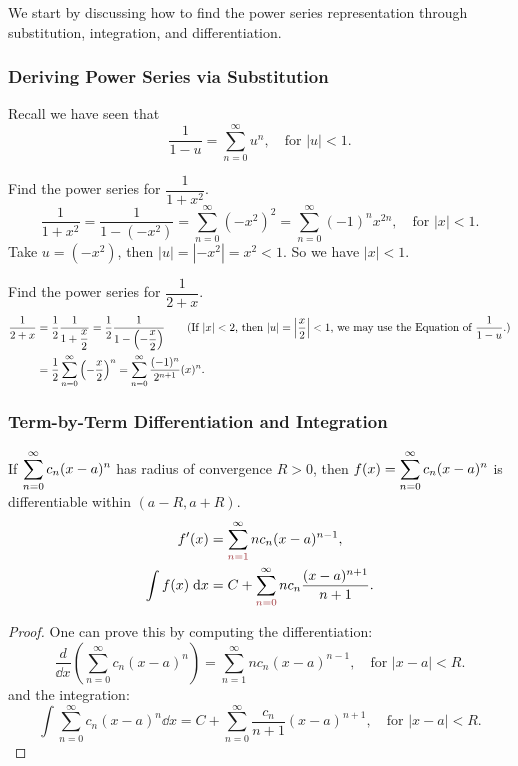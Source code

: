 We start by discussing how to find the power series representation through substitution, integration, and differentiation.

\subsubsection{Deriving Power Series via Substitution}
Recall we have seen that
\[\dfrac{1}{1-u} = \sum_{n=0}^\infty u^n, \quad \text{for } |u| < 1.\]

\begin{ex}
    Find the power series for $\dfrac{1}{1+x^2}$.
    \[
    \dfrac{1}{1+x^2} = \dfrac{1}{1-(-x^2)} = \sum_{n=0}^\infty (-x^2)^2 = \sum_{n=0}^\infty (-1)^n x^{2n}, \quad \text{for } |x| < 1.
    \]
    Take $u = (-x^2)$, then $|u| = |-x^2| = x^2 < 1$. So we have $|x| < 1$.
\end{ex}

\begin{ex}
    Find the power series for $\dfrac{1}{2+x}$.
    \begin{align*}
        \dfrac{1}{2+x} &= \dfrac{1}{2} \dfrac{1}{1+\dfrac{x}{2}} = \dfrac{1}{2} \dfrac{1}{1 - \left(-\dfrac{x}{2}\right)}\tag{If $|x|<2$, then $|u| = \left|\dfrac{x}{2}\right|<1$, we may use the Equation of $\dfrac{1}{1-u}$.}\\
        & = \dfrac{1}{2} \sum_{n=0}^\infty \left(-\dfrac{x}{2}\right)^n = \sum_{n=0}^\infty \dfrac{(-1)^n}{2^{n+1}} (x)^n.
    \end{align*}
\end{ex}

\subsubsection{Term-by-Term Differentiation and Integration}

\begin{thm}
    If $\displaystyle\sum_{n=0}^\infty c_n (x-a)^n$ has radius of convergence $R>0$, then $f(x) = \displaystyle\sum_{n=0}^\infty c_n (x-a)^n$ is differentiable within $(a-R, a+R)$.
    \begin{align*}
        f'(x) &= \dsum_{\red{n=1}}^\infty n c_n (x-a)^{n-1},\\
        \int f(x) \dd x &= C + \dsum_{\red{n=0}}^\infty n c_n \dfrac{(x-a)^{n+1}}{n+1}.
    \end{align*}
\end{thm}
\begin{proof}
    One can prove this by computing the differentiation:
    \[
    \dfrac{d}{\dd x} \left( \sum_{n=0}^\infty c_n (x-a)^n \right) = \sum_{n=1}^\infty n c_n (x-a)^{n-1}, \quad \text{for } |x-a| < R.
    \]
    and the integration:
    \[
    \int \sum_{n=0}^\infty c_n (x-a)^n \dd x = C + \sum_{n=0}^\infty \dfrac{c_n}{n+1} (x-a)^{n+1}, \quad \text{for } |x-a| < R.
    \]
\end{proof}

